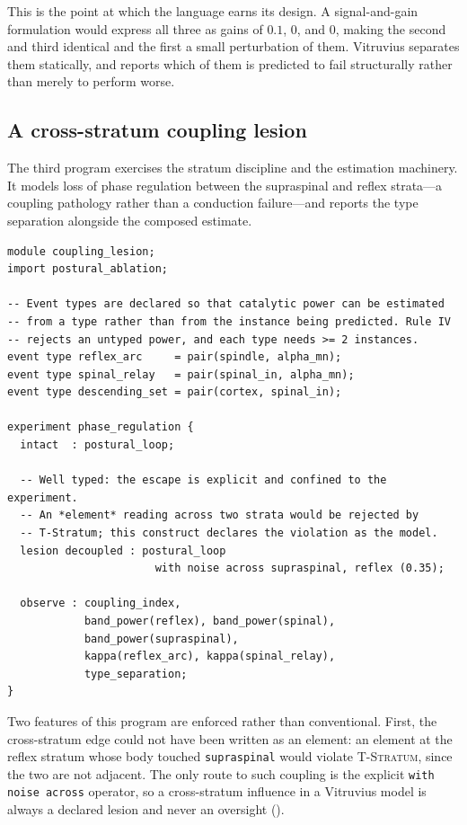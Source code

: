 \documentclass[11pt,twocolumn,a4paper]{article}
\theoremstyle{thmstyle}
\theoremstyle{definition}
\theoremstyle{remark}
\begin{document}
This is the point at which the language earns its design. A signal-and-gain
formulation would express all three as gains of $0.1$, $0$, and $0$, making
the second and third identical and the first a small perturbation of them.
Vitruvius separates them statically, and reports which of them is predicted to
fail structurally rather than merely to perform worse.

\subsection{A cross-stratum coupling lesion}

The third program exercises the stratum discipline and the estimation
machinery. It models loss of phase regulation between the supraspinal and
reflex strata---a coupling pathology rather than a conduction failure---and
reports the type separation alongside the composed estimate.

\begin{lstlisting}[style=vvs,caption={\texttt{coupling\_lesion.vvs} --- a
deliberate stratum violation, and the reporting obligation.},
label={lst:coupling}]
module coupling_lesion;
import postural_ablation;

-- Event types are declared so that catalytic power can be estimated
-- from a type rather than from the instance being predicted. Rule IV
-- rejects an untyped power, and each type needs >= 2 instances.
event type reflex_arc     = pair(spindle, alpha_mn);
event type spinal_relay   = pair(spinal_in, alpha_mn);
event type descending_set = pair(cortex, spinal_in);

experiment phase_regulation {
  intact  : postural_loop;

  -- Well typed: the escape is explicit and confined to the experiment.
  -- An *element* reading across two strata would be rejected by
  -- T-Stratum; this construct declares the violation as the model.
  lesion decoupled : postural_loop
                       with noise across supraspinal, reflex (0.35);

  observe : coupling_index,
            band_power(reflex), band_power(spinal),
            band_power(supraspinal),
            kappa(reflex_arc), kappa(spinal_relay),
            type_separation;
}
\end{lstlisting}

Two features of this program are enforced rather than conventional. First, the
cross-stratum edge could not have been written as an element: an element at
the reflex stratum whose body touched \texttt{supraspinal} would violate
\textsc{T-Stratum}, since the two are not adjacent. The only route to such
coupling is the explicit \texttt{with noise across} operator, so a
cross-stratum influence in a Vitruvius model is always a declared lesion and
never an oversight ().
\end{document}
